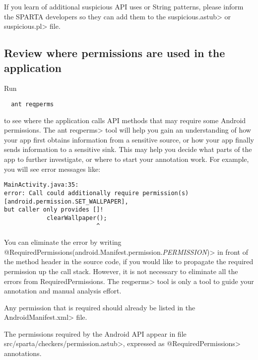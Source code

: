 If you learn of additional suspicious API uses or String patterns, please
inform the SPARTA developers so they can add them to the
\<suspicious.astub> or \<suspicious.pl> file.


\subsection{Review where permissions are used in the application}
\label{sec:appanalysis/reqperms}


Run

\begin{Verbatim}
  ant reqperms
\end{Verbatim}

\noindent
to see where the application calls API methods that may require some Android permissions.  
The \<ant reqperms> tool will help you gain an understanding of how your
app first obtains information from a sensitive source, or how your app
finally sends information to a sensitive sink.  This may help you decide
what parts of the app to further investigate, or where to start your
annotation work.
For example, you will see error messages like:

\begin{Verbatim}
MainActivity.java:35: 
error: Call could additionally require permission(s) [android.permission.SET_WALLPAPER], 
but caller only provides []!
			clearWallpaper();
			              ^
\end{Verbatim}


You can eliminate the error by writing
\<@RequiredPermissions({android.Manifest.permission.\emph{PERMISSION}})> in
front of the method header in the source code, if you would like to propagate the
required permission up the call stack.  However, it is not necessary to eliminate all the errors
from RequiredPermissions.   The \<reqperms> tool is only a tool to guide your annotation and
manual analysis effort. 

Any permission that is required should already be listed in the
\<AndroidManifest.xml> file.

The permissions required by the Android API appear in file
\<src/sparta/checkers/permission.astub>, expressed as
\<@RequiredPermissions> annotations.





